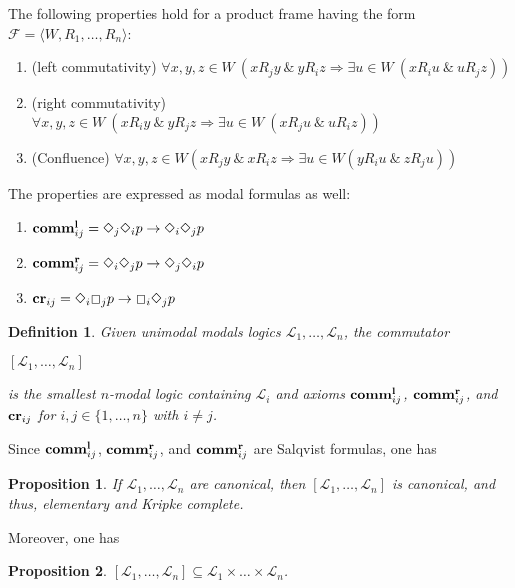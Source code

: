 \documentclass[a4paper]{article}
\theoremstyle{defin}
\newtheorem{defin}{Definition}
\theoremstyle{theorem}
\theoremstyle{prop}
\newtheorem{prop}{Proposition}
\theoremstyle{lemma}
\theoremstyle{ex}
\theoremstyle{col}
\begin{document}
The following properties hold for a product frame having the form $\mathcal{F} = \langle W, R_1, \dots, R_n \rangle$:

\begin{enumerate}
  \item (left commutativity) $\forall x, y, z \in W \: (x R_j y \: \& \: y R_i z \Rightarrow \exists u \in W \: (x R_i u \: \& \: u R_j z))$
  \item (right commutativity) $\forall x, y, z \in W \: (x R_i y \: \& \: y R_j z \Rightarrow \exists u \in W \: (x R_j u \: \& \: u R_i z))$
  \item (Confluence) $\forall x, y, z \in W (x R_j y \: \& \: x R_i z \Rightarrow \exists u \in W (y R_i u \: \& \: z R_j u))$
\end{enumerate}

The properties are expressed as modal formulas as well:
\begin{enumerate}
  \item ${\bf comm}^{\bf l}_{ij} = \Diamond_j \Diamond_i p \to \Diamond_i \Diamond_j p$
  \item ${\bf comm}^{\bf r}_{ij} = \Diamond_i \Diamond_j p \to \Diamond_j \Diamond_i p$
  \item ${\bf cr}_{ij} = \Diamond_i \Box_j p \to \Box_i \Diamond_j p$
\end{enumerate}

\begin{defin} Given unimodal modals logics $\mathcal{L}_1, \dots, \mathcal{L}_n$, the commutator

  \begin{center}
    $[\mathcal{L}_1, \dots, \mathcal{L}_n]$
  \end{center}
  is the smallest $n$-modal logic containing $\mathcal{L}_i$ and axioms ${\bf comm}^{\bf l}_{ij}$, ${\bf comm}^{\bf r}_{ij}$, and ${\bf cr}_{ij}$ for $i, j \in \{ 1, \dots, n\}$ with $i \neq j$.
\end{defin}

Since ${\bf comm}^{\bf l}_{ij}$, ${\bf comm}^{\bf r}_{ij}$, and ${\bf comm}^{\bf r}_{ij}$ are Salqvist formulas, one has

\begin{prop}
  If $\mathcal{L}_1, \dots, \mathcal{L}_n$ are canonical, then $[\mathcal{L}_1, \dots, \mathcal{L}_n]$ is canonical, and thus, elementary and Kripke complete.
\end{prop}

Moreover, one has

\begin{prop}
  $[\mathcal{L}_1, \dots, \mathcal{L}_n] \subseteq \mathcal{L}_1 \times \dots \times \mathcal{L}_n$.
\end{prop}
\end{document}
